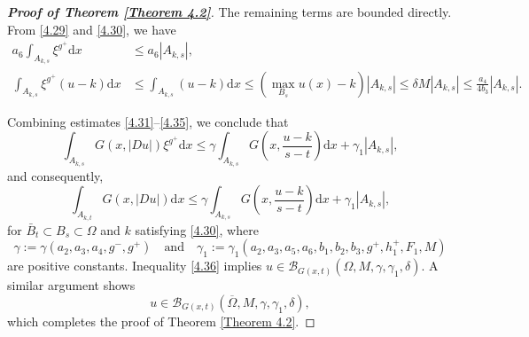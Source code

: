 \documentclass[10pt,reqno]{amsart}
\newcommand *\w{^\wedge}
\theoremstyle{definition}
\numberwithin{equation}{section}
\begin{document}
\begin{proof}[\textbf{Proof of Theorem \ref{Theorem 4.2}}]
 The remaining terms are bounded directly. From \eqref{4.29} and \eqref{4.30}, we have
\begin{align}
    a_6 \int_{A_{k,s}} \xi^{g^+}  \mathrm{d}x &\leq a_6 |A_{k,s}|, \\
    \int_{A_{k,s}} \xi^{g^+} (u - k)  \mathrm{d}x &\leq \int_{A_{k,s}} (u - k)  \mathrm{d}x \leq (\max_{B_s} u(x) - k) |A_{k,s}| \leq \delta M |A_{k,s}| \leq \frac{a_4}{4b_3} |A_{k,s}|. \label{4.35}
\end{align}

Combining estimates \eqref{4.31}--\eqref{4.35}, we conclude that
\[
\int_{A_{k,s}} G(x,|Du|) \xi^{g^+}  \mathrm{d}x \leq \gamma \int_{A_{k,s}} G\left(x, \frac{u - k}{s - t} \right)  \mathrm{d}x + \gamma_1 |A_{k,s}|,
\]
and consequently,
\begin{equation}\label{4.36}
\int_{A_{k,t}} G(x,|Du|)  \mathrm{d}x \leq \gamma \int_{A_{k,s}} G\left(x, \frac{u - k}{s - t} \right)  \mathrm{d}x + \gamma_1 |A_{k,s}|,
\end{equation}
for \(\bar{B}_t \subset B_s \subset \Omega\) and \(k\) satisfying \eqref{4.30}, where \[\gamma := \gamma(a_2, a_3, a_4, g^-, g^+)\quad \text{and} \quad \gamma_1 := \gamma_1(a_2, a_3, a_5, a_6, b_1, b_2, b_3, g^+, h^+_1, F_1, M)\] are positive constants. Inequality \eqref{4.36} implies \(u \in \mathcal{B}_{G(x,t)}(\Omega, M, \gamma, \gamma_1, \delta)\). A similar argument shows \[u \in \mathcal{B}_{G(x,t)}(\overline{\Omega}, M, \gamma, \gamma_1, \delta),\] which completes the proof of Theorem \ref{Theorem 4.2}.
\end{proof}
\end{document}
